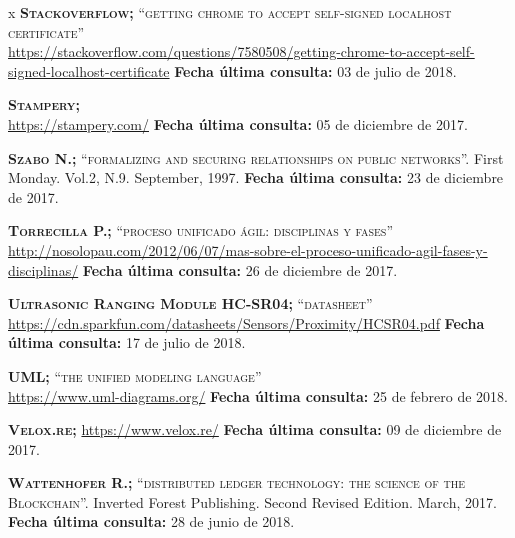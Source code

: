 \begin{thebibliography} {x}
	 \textsc{\textbf{Stackoverflow; }}\textsc{“getting chrome to accept self-signed localhost certificate”} \\ 
	\url{https://stackoverflow.com/questions/7580508/getting-chrome-to-accept-self-signed-localhost-certificate}
	\newline \textbf{Fecha última consulta:} 03 de julio de 2018.
		
	 \textsc{\textbf{Stampery; }} \\
	\url{https://stampery.com/}
	\newline \textbf{Fecha última consulta:} 05 de diciembre de 2017.
				
	 \textsc{\textbf{Szabo N.; }} \textsc{“formalizing and securing relationships on public networks”.} First Monday. Vol.2, N.9. September, 1997.	
	\newline \textbf{Fecha última consulta:} 23 de diciembre de 2017.
		
	 \textsc{\textbf{Torrecilla P.; }}\textsc{“proceso unificado ágil: disciplinas y fases”} \\ 
	\url{http://nosolopau.com/2012/06/07/mas-sobre-el-proceso-unificado-agil-fases-y-disciplinas/}
	\newline \textbf{Fecha última consulta:} 26 de diciembre de 2017.
		
	 \textsc{\textbf{Ultrasonic Ranging Module HC-SR04; }}\textsc{“datasheet”} \\
	\url{https://cdn.sparkfun.com/datasheets/Sensors/Proximity/HCSR04.pdf}
	\newline \textbf{Fecha última consulta:} 17 de julio de 2018.
				
	 \textsc{\textbf{UML; }}\textsc{“the unified modeling language”} \\ 
	\url{https://www.uml-diagrams.org/}
	\newline \textbf{Fecha última consulta:} 25 de febrero de 2018.	
		
	 \textsc{\textbf{Velox.re; }} 
	\url{https://www.velox.re/}
	\newline \textbf{Fecha última consulta:} 09 de diciembre de 2017.
	
	 \textsc{\textbf{Wattenhofer R.; }}\textsc{“distributed ledger technology: the science of the Blockchain”.} Inverted Forest Publishing. Second Revised Edition. March, 2017.
	\newline \textbf{Fecha última consulta:} 28 de junio de 2018.
	

\end{thebibliography}

